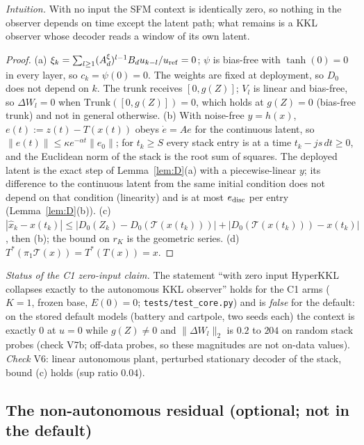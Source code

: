 \emph{Intuition.} With no input the SFM context is identically zero, so nothing in the observer depends on time
except the latent path; what remains is a KKL observer whose decoder reads a window of its own latent.
\begin{proof}
(a) $\xi_k=\sum_{l\ge1}(A^\xi_d)^{l-1}B_du_{k-l}/u_{\rm ref}=0$; $\psi$ is bias-free with $\tanh(0)=0$ in every layer, so
$c_k=\psi(0)=0$. The weights are fixed at deployment, so $D_0$ does not depend on $k$. The trunk receives $[0,g(Z)]$;
$V_l$ is linear and bias-free, so $\Delta W_l=0$ when $\mathrm{Trunk}([0,g(Z)])=0$, which holds at $g(Z)=0$ (bias-free
trunk) and not in general otherwise. (b) With noise-free $y=h(x)$, $e(t):=z(t)-T(x(t))$ obeys $\dot e=Ae$ for the
continuous latent, so $\|e(t)\|\le\kappa e^{-\alpha t}\|e_0\|$; for $t_k\ge S$ every stack entry is at a time
$t_k-js\,dt\ge0$, and the Euclidean norm of the stack is the root sum of squares. The deployed latent is the exact
step of Lemma~\ref{lem:D}(a) with a piecewise-linear $y$; its difference to the continuous latent from the same initial
condition does not depend on that condition (linearity) and is at most $e_{\rm disc}$ per entry (Lemma~\ref{lem:D}(b)).
(c) $|\hat x_k-x(t_k)|\le|D_0(Z_k)-D_0(\mathcal T(x(t_k)))|+|D_0(\mathcal T(x(t_k)))-x(t_k)|$, then (b); the bound on
$r_K$ is the geometric series. (d) $T^*(\pi_1\mathcal T(x))=T^*(T(x))=x$.
\end{proof}
\noindent\emph{Status of the C1 zero-input claim.} The statement ``with zero input HyperKKL collapses exactly to the
autonomous KKL observer'' holds for the C1 arms ($K=1$, frozen base, $E(0)=0$; \texttt{tests/test\_core.py}) and is
\emph{false} for the default: on the stored default models (battery and cartpole, two seeds each) the context is exactly
$0$ at $u=0$ while $g(Z)\ne0$ and $\|\Delta W_l\|_2$ is $0.2$ to $204$ on random stack probes (check V7b; off-data
probes, so these magnitudes are not on-data values). \emph{Check} V6: linear autonomous plant, perturbed stationary
decoder of the stack, bound (c) holds (sup ratio $0.04$).

\subsection{The non-autonomous residual (optional; not in the default)}

